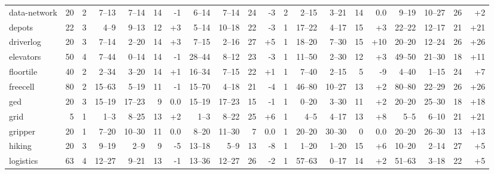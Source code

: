 \documentclass{article}
\begin{document}
\begin{table}
\begin{tabular}{l@{}rr|rrrr|rrrr|r|rrrr|rrrr}
 data-network &    20 &   2 &   7--13 &  7--14 & 14 &  {\color{red}-1} &   6--14 &  7--14 & 24 &   {\color{red}-3} &   2 &    2--15 &  3--21 & 14 &               0.0 &    9--19 & 10--27 & 26 &  {\color{blue}+2} \\
       depots &    22 &   3 &    4--9 &  9--13 & 12 & {\color{blue}+3} &   5--14 & 10--18 & 22 &   {\color{red}-3} &   1 &   17--22 &  4--17 & 15 &  {\color{blue}+3} &   22--22 & 12--17 & 21 & {\color{blue}+21} \\
    driverlog &    20 &   3 &   7--14 &  2--20 & 14 & {\color{blue}+3} &   7--15 &  2--16 & 27 &  {\color{blue}+5} &   1 &   18--20 &  7--30 & 15 & {\color{blue}+10} &   20--20 & 12--24 & 26 & {\color{blue}+26} \\
    elevators &    50 &   4 &   7--44 &  0--14 & 14 &  {\color{red}-1} &  28--44 &  8--12 & 23 &   {\color{red}-3} &   1 &   11--50 &  2--30 & 12 &  {\color{blue}+3} &   49--50 & 21--30 & 18 & {\color{blue}+11} \\
    floortile &    40 &   2 &   2--34 &  3--20 & 14 & {\color{blue}+1} &  16--34 &  7--15 & 22 &  {\color{blue}+1} &   1 &    7--40 &  2--15 &  5 &   {\color{red}-9} &    4--40 &  1--15 & 24 &  {\color{blue}+7} \\
     freecell &    80 &   2 &  15--63 &  5--19 & 11 &  {\color{red}-1} &  15--70 &  4--18 & 21 &   {\color{red}-4} &   1 &   46--80 & 10--27 & 13 &  {\color{blue}+2} &   80--80 & 22--29 & 26 & {\color{blue}+26} \\
          ged &    20 &   3 &  15--19 & 17--23 &  9 &              0.0 &  15--19 & 17--23 & 15 &   {\color{red}-1} &   1 &    0--20 &  3--30 & 11 &  {\color{blue}+2} &   20--20 & 25--30 & 18 & {\color{blue}+18} \\
         grid &     5 &   1 &    1--3 &  8--25 & 13 & {\color{blue}+2} &    1--3 &  8--22 & 25 &  {\color{blue}+6} &   1 &     4--5 &  4--17 & 13 &  {\color{blue}+8} &     5--5 &  6--10 & 21 & {\color{blue}+21} \\
      gripper &    20 &   1 &   7--20 & 10--30 & 11 &              0.0 &   8--20 & 11--30 &  7 &               0.0 &   1 &   20--20 & 30--30 &  0 &               0.0 &   20--20 & 26--30 & 13 & {\color{blue}+13} \\
       hiking &    20 &   3 &   9--19 &   2--9 &  9 &  {\color{red}-5} &  13--18 &   5--9 & 13 &   {\color{red}-8} &   1 &    1--20 &  1--20 & 15 &  {\color{blue}+6} &   10--20 &  2--14 & 27 &  {\color{blue}+5} \\
    logistics &    63 &   4 &  12--27 &  9--21 & 13 &  {\color{red}-1} &  13--36 & 12--27 & 26 &   {\color{red}-2} &   1 &   57--63 &  0--17 & 14 &  {\color{blue}+2} &   51--63 &  3--18 & 22 &  {\color{blue}+5} \\

\end{tabular}
\end{table}
\end{document}
